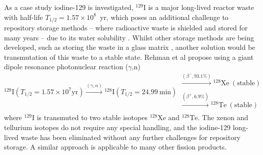 \documentclass[../main.tex]{subfiles}
\begin{document}
As a case study iodine-129 is investigated, $^{129}\mathrm{I}$ is a major long-lived reactor waste with half-life $T_{1/2} = 1.57\times 10^{8}$~yr, which poses an additional challenge to repository storage methods -- where radioactive waste is shielded and stored for many years -- due to its water solubility \cite{cho2016reconsideration}. Whilst other storage methods are being developed, such as storing the waste in a glass matrix  \cite{lee2021chemical,morizet2021immobilization}, another solution would be transmutation of this waste to a stable state. Rehman et al \cite{ur2017optimization} propose using a giant dipole resonance photonuclear reaction ($\gamma$,n)
\begin{equation}
^{129}\mathrm{I} \left(T_{1/2}=1.57\times 10^{7}\textrm{yr}\right) \xrightarrow[]{\left(\gamma,n\right)} {}^{128}\mathrm{I} \left(T_{1/2}=24.99~\mathrm{\si{\minute}}\right) \substack{\xrightarrow[]{\left(\beta^{-},93.1\%\right)} {}^{128}\mathrm{Xe}~\left(\mathrm{stable}\right)\\[0.1em] \xrightarrow[]{\left(\beta^{+},6.9\%\right)} {}^{128}\mathrm{Te}~\left(\mathrm{stable}\right)}
\label{eq:129I_photonuclear_transmutation}
\end{equation}
where $^{129}\mathrm{I}$ is transmuted to two stable isotopes $^{128}\mathrm{Xe}$ and $^{128}\mathrm{Te}$. The xenon and tellurium isotopes do not require any special handling, and the iodine-129 long-lived waste has been eliminated without any further challenges for repository storage. A similar approach is applicable to many other fission products.
\end{document}
